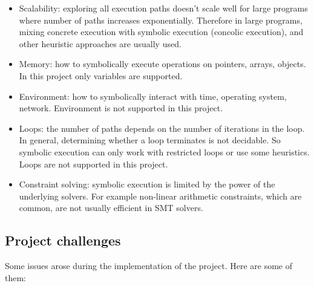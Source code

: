 \documentclass[12pt,a4paper]{article}
\begin{document}
\begin{itemize}
\item Scalability: exploring all execution paths doesn't scale well for large programs where number of paths increases exponentially. Therefore in large programs, mixing concrete execution with symbolic execution (concolic execution), and other heuristic approaches are usually used. 

\item Memory: how to symbolically execute operations on pointers, arrays, objects. In this project only variables are supported. 
\item Environment: how to symbolically interact with time, operating system, network. Environment is not supported in this project.
\item Loops: the number of paths depends on the number of iterations in the loop. In general, determining whether a loop terminates is not decidable. So symbolic execution can only work with restricted loops or use some heuristics. Loops are not supported in this project.
\item Constraint solving:  symbolic execution is limited by the power of the underlying solvers. For example non-linear arithmetic constraints, which are common, are not usually efficient in SMT solvers. 

\end{itemize}

\subsection{Project challenges}

Some issues arose during the implementation of the project. Here are some of them:
\end{document}
